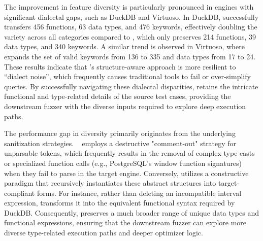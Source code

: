 \documentclass[sigconf,review,anonymous]{acmart}
\begin{document}
The improvement in feature diversity is particularly pronounced in engines with significant dialectal gaps, such as DuckDB and Virtuoso. In DuckDB, \tool{} successfully transfers 456 functions, 63 data types, and 476 keywords, effectively doubling the variety across all categories compared to \sedar{}, which only preserves 214 functions, 39 data types, and 340 keywords. A similar trend is observed in Virtuoso, where \tool{} expands the set of valid keywords from 136 to 335 and data types from 17 to 24. These results indicate that \tool{}'s structure-aware approach is more resilient to ``dialect noise'', which frequently causes traditional tools to fail or over-simplify queries. 
By successfully navigating these dialectal disparities, \tool{} retains the intricate functional and type-related details of the source test cases, providing the downstream fuzzer with the diverse inputs required to explore deep execution paths.

The performance gap in diversity primarily originates from the underlying sanitization strategies. \sedar{}~\cite{fu2024sedar} employs a destructive "comment-out" strategy for unparsable tokens, which frequently results in the removal of complex type casts or specialized function calls (e.g., PostgreSQL’s 
window function signatures) when they fail to parse in the target engine. Conversely, \tool{} utilizes a constructive paradigm that recursively instantiates these abstract structures into target-compliant forms. For instance, rather than deleting an incompatible interval expression, \tool{} transforms it into the equivalent functional syntax required by DuckDB. Consequently, \tool{} preserves a much broader range of unique data types and functional expressions, ensuring that the downstream fuzzer can explore more diverse type-related execution paths and deeper optimizer logic.



\end{document}
